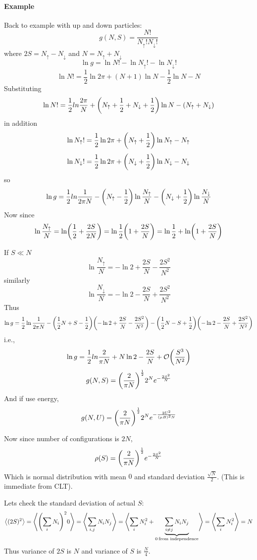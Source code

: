 \paragraph{Example}
Back to example with up and down particles:
$$g(N,S) = \frac{N!}{N_{\uparrow}!N_\downarrow!}$$
where $2S = N_\uparrow - N_\downarrow$ and $N= N_\uparrow + N_\downarrow$
$$\ln g = \ln N! - \ln N_\uparrow ! - \ln N_\downarrow!$$
$$\ln N! = \frac{1}{2} \ln 2\pi + (N+1) \ln N - \frac{1}{2} \ln N - N$$
Substituting
\begin{align*}
\ln N! = \frac{1}{2}ln \frac{2\pi}{N} + \qty(N_\uparrow + \frac{1}{2} + N_\downarrow + \frac{1}{2}) \ln N - (N_\uparrow + N_\downarrow)
\end{align*}
in addition
$$\ln N_\uparrow! = \frac{1}{2} \ln 2\pi + \qty(N_\uparrow + \frac{1}{2}) \ln N_\uparrow - N_\uparrow$$
$$\ln N_\downarrow! = \frac{1}{2} \ln 2\pi + \qty(N_\downarrow + \frac{1}{2}) \ln N_\downarrow - N_\downarrow$$
so
$$\ln g = \frac{1}{2}ln \frac{1}{2\pi N}  - \qty(N_\uparrow - \frac{1}{2}) \ln \frac{N_\uparrow}{N}   - \qty(N_\downarrow + \frac{1}{2}) \ln \frac{N_\downarrow}{N} $$
Now since
\begin{align*}
\ln \frac{N_\uparrow}{N} = \ln(\frac{1}{2} + \frac{2S}{2N}) = \ln\frac{1}{2}\qty(1 + \frac{2S}{N}) = \ln \frac{1}{2} + \ln(1+\frac{2S}{N})
\end{align*}

If $S \ll N$
$$\ln \frac{N_\uparrow}{N}  = -\ln 2 + \frac{2S}{N} - \frac{2S^2}{N^2}$$
similarly
$$\ln \frac{N_\downarrow}{N}  = -\ln 2 - \frac{2S}{N} + \frac{2S^2}{N^2}$$
Thus
\begin{align*}
\ln g = \frac{1}{2}\ln \frac{1}{2\pi N}  - \qty(\frac{1}{2}N + S - \frac{1}{2}) \qty(-\ln 2 + \frac{2S}{N} - \frac{2S^2}{N^2})  - \qty(\frac{1}{2}N - S + \frac{1}{2}) \qty(-\ln 2 - \frac{2S}{N} +  \frac{2S^2}{N^2})
\end{align*}
i.e.,
$$\ln g = \frac{1}{2}ln \frac{2}{\pi N}  + N \ln 2 -\frac{2S}{N} + \order{\frac{S^3}{N^2}}$$
$$g(N,S) = \qty(\frac{2}{\pi N})^{\frac{1}{2}} 2^N e^{-\frac{2S^2}{N}}$$
And if use energy,
$$g(N, U) = \qty(\frac{2}{\pi N})^{\frac{1}{2}} 2^N e^{-\frac{2U^2}{(\mu B)^2N}}$$

Now since number of configurations is $2N$, 
$$\rho(S) = \qty(\frac{2}{\pi N})^{\frac{1}{2}} e^{-\frac{2S^2}{N}} $$
Which is normal distribution with mean $0$ and standard deviation $\frac{\sqrt{N}}{2}$.  (This is immediate from CLT).

Lets check the standard deviation of actual $S$:
\begin{align*}
\big\langle (2S)^2 \big\rangle = \left\langle \qty(\sum_i N_i)^2
0 \right\rangle = \left\langle \sum_{i,j} N_iN_j \right\rangle = \left\langle \sum_i N_i^2 + \underbrace{\sum_{i\neq j} N_iN_j}_{0 \: \text{from independence}} \right\rangle  =\left\langle \sum_i N_i^2\right\rangle = N
\end{align*}
Thus variance of $2S$ is $N$ and variance of $S$ is $\frac{N}{4}$.